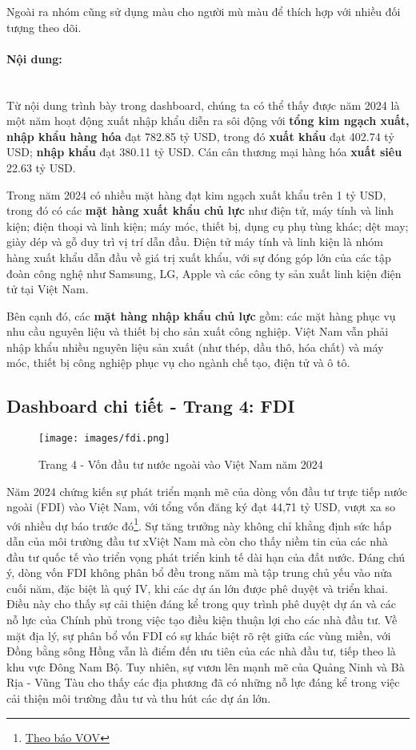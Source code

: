 \documentclass[a4paper]{report}
\begin{document}
{{Ngoài ra nhóm cũng sử dụng màu cho người mù màu để thích hợp với nhiều đối tượng theo dõi.

\paragraph{Nội dung:} \mbox{}\\
Từ nội dung trình bày trong dashboard, chúng ta có thể thấy được năm 2024 là một năm hoạt động xuất nhập khẩu diễn ra sôi động với \textbf{tổng kim ngạch xuất, nhập khẩu hàng hóa} đạt 782.85 tỷ USD, trong đó \textbf{xuất khẩu} đạt 402.74 tỷ USD; \textbf{nhập khẩu} đạt 380.11 tỷ USD. Cán cân thương mại hàng hóa \textbf{xuất siêu} 22.63 tỷ USD.

Trong năm 2024 có nhiều mặt hàng đạt kim ngạch xuất khẩu trên 1 tỷ USD, trong đó có các \textbf{mặt hàng xuất khẩu chủ lực} như điện tử, máy tính và linh kiện; điện thoại và linh kiện; máy móc, thiết bị, dụng cụ phụ tùng khác; dệt may; giày dép và gỗ duy trì vị trí dẫn đầu. Điện tử máy tính và linh kiện là nhóm hàng xuất khẩu dẫn đầu về giá trị xuất khẩu, với sự đóng góp lớn của các tập đoàn công nghệ như Samsung, LG, Apple và các công ty sản xuất linh kiện điện tử tại Việt Nam.

Bên cạnh đó, các \textbf{mặt hàng nhập khẩu chủ lực} gồm: các mặt hàng phục vụ nhu cầu nguyên liệu và thiết bị cho sản xuất công nghiệp. Việt Nam vẫn phải nhập khẩu nhiều nguyên liệu sản xuất (như thép, dầu thô, hóa chất) và máy móc, thiết bị công nghiệp phục vụ cho ngành chế tạo, điện tử và ô tô. 

\subsection{Dashboard chi tiết - Trang 4: FDI}
\begin{figure}[H]
    \centering
    \texttt{[image: images/fdi.png]}
    \caption{Trang 4 - Vốn đầu tư nước ngoài vào Việt Nam năm 2024}
    \label{fig:enter-label}
\end{figure}

Năm 2024 chứng kiến sự phát triển mạnh mẽ của dòng vốn đầu tư trực tiếp nước ngoài (FDI) vào Việt Nam, với tổng vốn đăng ký đạt 44,71 tỷ USD, vượt xa so với nhiều dự báo trước đó\footnote{\href{https://vov.vn/kinh-te/3138-ty-usd-von-fdi-rot-vao-viet-nam-trong-11-thang-post1140227.vov}{Theo báo VOV}}.
Sự tăng trưởng này không chỉ khẳng định sức hấp dẫn của môi trường đầu tư xViệt Nam mà còn cho thấy niềm tin của các nhà đầu tư quốc tế vào triển vọng phát triển kinh tế dài hạn của đất nước. Đáng chú ý, dòng vốn FDI không phân bổ đều trong năm mà tập trung chủ yếu vào nửa cuối năm, đặc biệt là quý IV, khi các dự án lớn được phê duyệt và triển khai. Điều này cho thấy sự cải thiện đáng kể trong quy trình phê duyệt dự án và các nỗ lực của Chính phủ trong việc tạo điều kiện thuận lợi cho các nhà đầu tư. Về mặt địa lý, sự phân bổ vốn FDI có sự khác biệt rõ rệt giữa các vùng miền, với Đồng bằng sông Hồng vẫn là điểm đến ưu tiên của các nhà đầu tư, tiếp theo là khu vực Đông Nam Bộ. Tuy nhiên, sự vươn lên mạnh mẽ của Quảng Ninh và Bà Rịa - Vũng Tàu cho thấy các địa phương đã có những nỗ lực đáng kể trong việc cải thiện môi trường đầu tư và thu hút các dự án lớn.\\

}}
\end{document}

